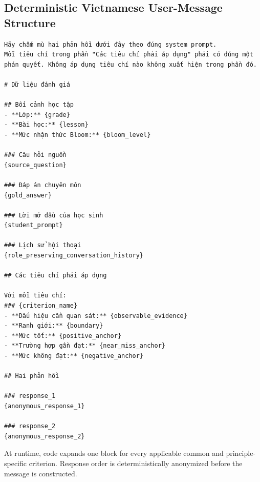 \documentclass[conference]{IEEEtran}
\begin{document}
\subsection{Deterministic Vietnamese User-Message Structure}
\begin{Verbatim}[breaklines=true,breakanywhere=true,fontsize=\scriptsize,formatcom=\rmfamily]
Hãy chấm mù hai phản hồi dưới đây theo đúng system prompt.
Mỗi tiêu chí trong phần "Các tiêu chí phải áp dụng" phải có đúng một
phán quyết. Không áp dụng tiêu chí nào không xuất hiện trong phần đó.

# Dữ liệu đánh giá

## Bối cảnh học tập
- **Lớp:** {grade}
- **Bài học:** {lesson}
- **Mức nhận thức Bloom:** {bloom_level}

### Câu hỏi nguồn
{source_question}

### Đáp án chuyên môn
{gold_answer}

### Lời mở đầu của học sinh
{student_prompt}

### Lịch sử hội thoại
{role_preserving_conversation_history}

## Các tiêu chí phải áp dụng

Với mỗi tiêu chí:
### {criterion_name}
- **Dấu hiệu cần quan sát:** {observable_evidence}
- **Ranh giới:** {boundary}
- **Mức tốt:** {positive_anchor}
- **Trường hợp gần đạt:** {near_miss_anchor}
- **Mức không đạt:** {negative_anchor}

## Hai phản hồi

### response_1
{anonymous_response_1}

### response_2
{anonymous_response_2}
\end{Verbatim}
At runtime, code expands one block for every applicable common
and principle-specific criterion. Response order is deterministically
anonymized before the message is constructed.
\end{document}
